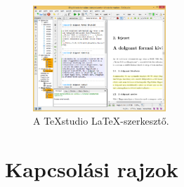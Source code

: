 \begin{figure}[!ht]
\centering
\includegraphics[width=50mm, keepaspectratio]{figures/TeXstudio.png}
\caption{A TeXstudio \LaTeX-szerkesztő.} 
\end{figure}


\clearpage
\section{Kapcsolási rajzok}

